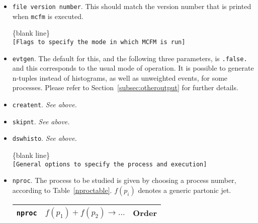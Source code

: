\documentclass[12pt]{article}
\begin{document}
\begin{itemize}
\item {\tt file version number}. This should match the version number
that is printed when {\tt mcfm} is executed.

\begin{center}
\{blank line\} \\
{\tt [Flags to specify the mode in which MCFM is run] }
\end{center}

\item {\tt evtgen}. The default for this, and the following three
parameters, is {\tt .false.} and this corresponds to the usual mode
of operation. It is possible to generate n-tuples instead of histograms,
as well as unweighted events, for some processes. Please refer to
Section~\ref{subsec:otheroutput} for further details.
\item {\tt creatent}. {\it See above.}
\item {\tt skipnt}. {\it See above.}
\item {\tt dswhisto}. {\it See above.}

\begin{center}
\{blank line\} \\
{\tt [General options to specify the process and execution] }
\end{center}

\item {\tt nproc}.
The process to be studied is given by
choosing a process number, according to Table~\ref{nproctable}.
$f(p_i)$ denotes a generic partonic jet.

\begin{table}
\begin{center}
\hspace*{-1.5cm}
\begin{tabular}{|l|l|l|}
\hline
{\tt nproc} & $f(p_1)+f(p_2) \to \ldots $& Order \\
\hline
 

\end{tabular}
\end{center}
\end{table}
\end{itemize}
\end{document}
